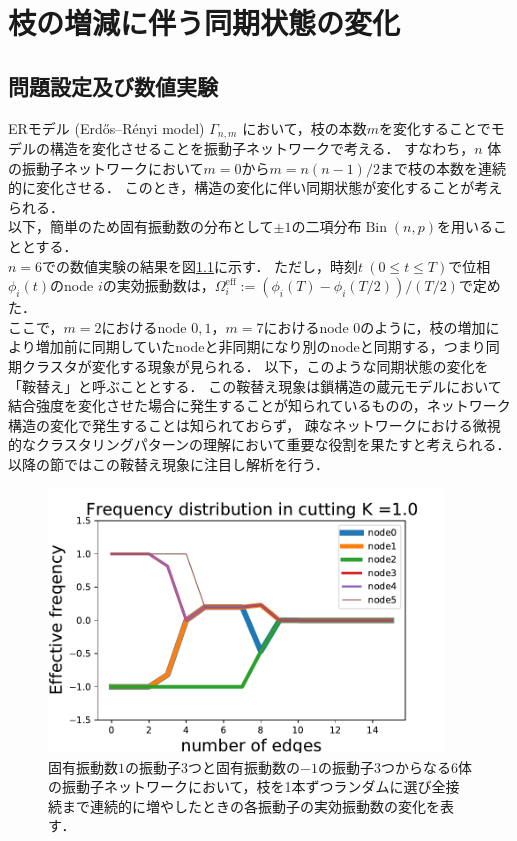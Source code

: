 \documentclass[../main]{subfiles}
\begin{document}
\chapter{枝の増減に伴う同期状態の変化}
\label{chap:method-3body}
\section{問題設定及び数値実験}
\label{sec:method-3body-settting}
ERモデル (Erdős–Rényi model) $\Gamma_{n,m}$ において，枝の本数$m$を変化することでモデルの構造を変化させることを振動子ネットワークで考える．
すなわち，$n$ 体の振動子ネットワークにおいて$m=0$から$m=n(n-1)/2$まで枝の本数を連続的に変化させる．
このとき，構造の変化に伴い同期状態が変化することが考えられる．\\
以下，簡単のため固有振動数の分布として$\pm 1$の二項分布$\operatorname{Bin}(n,p)$を用いることとする．\\
$n=6$での数値実験の結果を図\ref{fig:cutting_N6K1}に示す．
ただし，時刻$t\ (0\leq t\leq T)$で位相$\phi_i(t)$のnode $i$の実効振動数は，$\Omega_i^{\mathrm{eff}}:=(\phi_i(T)-\phi_i(T/2))/(T/2)$で定めた．\\
ここで，$m=2$におけるnode $0,1$，$m=7$におけるnode $0$のように，枝の増加により増加前に同期していたnodeと非同期になり別のnodeと同期する，つまり同期クラスタが変化する現象が見られる．
以下，このような同期状態の変化を「鞍替え」と呼ぶこととする．
この鞍替え現象は鎖構造の蔵元モデルにおいて結合強度を変化させた場合に発生することが知られている\cite{XiaHuang:130506}ものの，ネットワーク構造の変化で発生することは知られておらず，
疎なネットワークにおける微視的なクラスタリングパターンの理解において重要な役割を果たすと考えられる．
以降の節ではこの鞍替え現象に注目し解析を行う．
\begin{figure}[t]
\centering
\includegraphics[width=105mm]{./images/cutting_N6K1.pdf}
\centering
\caption{固有振動数$1$の振動子3つと固有振動数の$-1$の振動子3つからなる6体の振動子ネットワークにおいて，枝を1本ずつランダムに選び全接続まで連続的に増やしたときの各振動子の実効振動数の変化を表す．}
\label{fig:cutting_N6K1}
\end{figure}
\end{document}
